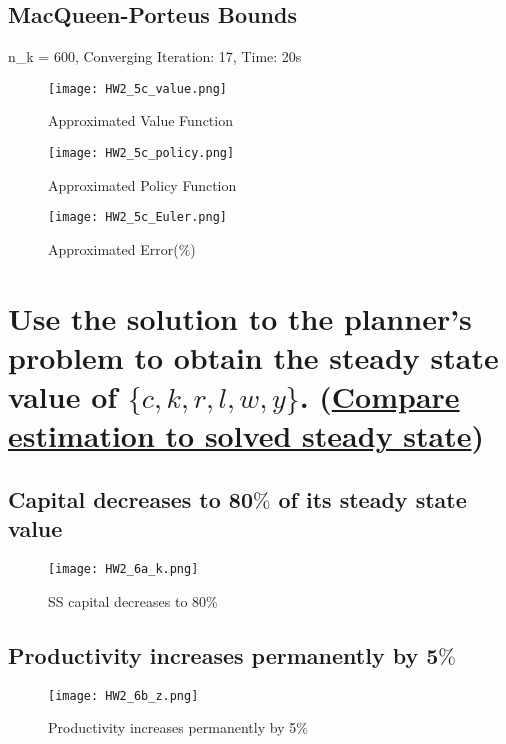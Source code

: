 \documentclass{article}
\begin{document}
\subsection{MacQueen-Porteus Bounds}
n\_k = 600, Converging Iteration: 17, Time: 20s
\begin{figure}[!htbp]
\centering
  \texttt{[image: HW2\_5c\_value.png]}
  \caption{Approximated Value Function}
  \label{fig:boat1}
\end{figure}
\begin{figure}[!htbp]
\centering
  \texttt{[image: HW2\_5c\_policy.png]}
  \caption{Approximated Policy Function}
  \label{fig:boat1}
\end{figure}
\begin{figure}[!htbp]
\centering
  \texttt{[image: HW2\_5c\_Euler.png]}
  \caption{Approximated Error($\%$)}
  \label{fig:boat1}
\end{figure}
\section{Use the solution to the planner’s problem to obtain the steady state value of $\{c, k, r,l,w, y\}$. (\underline{Compare estimation to solved steady state})}
\subsection{Capital decreases to 80$\%$ of its steady state value}
\begin{figure}[!htbp]
\centering
  \texttt{[image: HW2\_6a\_k.png]}
  \caption{SS capital decreases to 80$\%$ }
  \label{fig:boat1}
\end{figure}
\subsection{Productivity increases permanently by 5$\%$}
\pagebreak
\begin{figure}[!htbp]
\centering
  \texttt{[image: HW2\_6b\_z.png]}
  \caption{Productivity increases permanently by 5$\%$ }
  \label{fig:boat1}
\end{figure}
\end{document}
